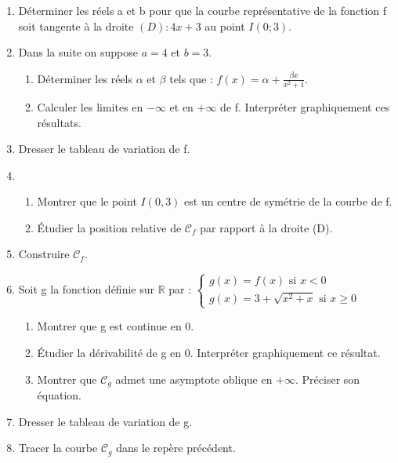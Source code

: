 \documentclass[a4paper,12pt]{book}
\begin{document}
\begin{enumerate}
	\item Déterminer les réels a et b pour que la courbe représentative de la fonction f soit tangente à la droite $(D):4x+3$ au point $I(0;3)$.
	\item Dans la suite on suppose $a=4$ et $b=3$.
	\begin{enumerate}
		\item Déterminer les réels $\alpha$ et $\beta$ tels que : $\displaystyle{f(x)=\alpha+\frac{\beta x}{x^2+1}}$.
		\item Calculer les limites en $-\infty$ et en $+\infty$ de f. Interpréter graphiquement ces résultats.
	\end{enumerate}
	\item Dresser le tableau de variation de f.
	\item 
	\begin{enumerate}
		\item Montrer que le point $I(0,3)$ est un centre de symétrie de la courbe de f.
		\item Étudier la position relative de $\mathcal{C}_f$ par rapport à la droite (D).
	\end{enumerate}
	\item Construire $\mathcal{C}_f$.
	\item Soit g la fonction définie sur $\mathbb{R}$ par :
	$\begin{cases}
	g(x)=f(x) \text{ si } x<0 \\
	g(x)=3 +\sqrt{x^2+x} \text{ si } x\geq 0	 
	\end{cases}$
	\begin{enumerate}
		\item Montrer que g est continue en 0.
		\item Étudier la dérivabilité de g en 0. Interpréter graphiquement ce résultat.
		\item Montrer  que $\mathcal{C}_g$ admet une asymptote oblique en $+\infty$. Préciser son équation.	
	\end{enumerate}
	\item Dresser le tableau de variation de g.
	\item  Tracer la courbe $\mathcal{C}_g$ dans le repère précédent.
\end{enumerate}
\end{document}
